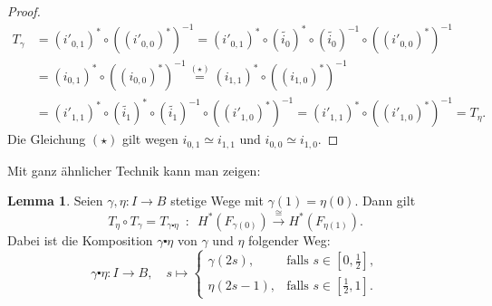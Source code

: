 \documentclass[11pt, a4paper, german]{article}
\theoremstyle{definition}
\newtheorem{lem}{Lemma}
\theoremstyle{remark}
\begin{document}
\begin{proof}
\begin{align*}
    T_\gamma &
    = (i'_{0,1})^* \circ ((i'_{0,0})^*)^{-1}
    = (i'_{0,1})^* \circ (\widetilde{i_0})^* \circ (\widetilde{i_0})^{-1} \circ ((i'_{0,0})^*)^{-1} \\
    & = (i_{0,1})^* \circ ((i_{0,0})^*)^{-1}
    \stackrel{(\star)}{=} (i_{1,1})^* \circ ((i_{1,0})^*)^{-1} \\
    & = (i'_{1,1})^* \circ (\widetilde{i_1})^* \circ (\widetilde{i_1})^{-1} \circ ((i'_{1,0})^*)^{-1}
    = (i'_{1,1})^* \circ ((i'_{1,0})^*)^{-1}
    = T_\eta.
  \end{align*}
  Die Gleichung $(\star)$ gilt wegen $i_{0,1} \simeq i_{1,1}$ und $i_{0,0} \simeq i_{1,0}$.
\end{proof}

Mit ganz ähnlicher Technik kann man zeigen:

\begin{lem}
  Seien $\gamma, \eta : I \to B$ stetige Wege mit $\gamma(1) = \eta(0)$.
  Dann gilt
  \[ T_\eta \circ T_\gamma = T_{\gamma \centerdot \eta} \enspace:\enspace H^*(F_{\gamma(0)}) \xrightarrow{\cong} H^*(F_{\eta(1)}). \]
  Dabei ist die Komposition $\gamma \centerdot \eta$ von $\gamma$ und $\eta$ folgender Weg:
  \[
    \gamma \centerdot \eta : I \to B, \quad
    s \mapsto \begin{cases}
      \gamma(2s), & \text{falls } s \in [0, \tfrac{1}{2}], \\
      \eta(2s - 1), & \text{falls } s \in [\tfrac{1}{2}, 1].
    \end{cases}
  \]
\end{lem}
\end{document}
